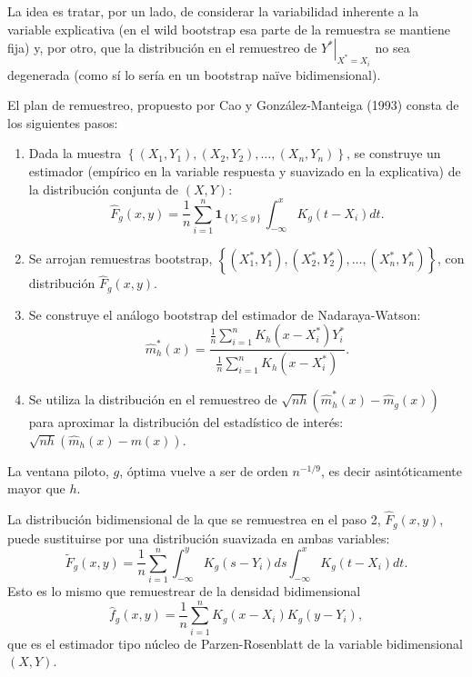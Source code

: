 \documentclass[]{book}
\theoremstyle{definition}
\theoremstyle{definition}
\theoremstyle{definition}
\theoremstyle{remark}
\begin{document}
La idea es tratar, por un lado, de considerar la variabilidad inherente
a la variable explicativa (en el wild bootstrap esa parte de la
remuestra se mantiene fija) y, por otro, que la distribución en el
remuestreo de \(\left. Y^{\ast}\right\vert _{X^{\ast}=X_i}\) no sea
degenerada (como sí lo sería en un bootstrap naïve bidimensional).

El plan de remuestreo, propuesto por Cao y González-Manteiga (1993)
consta de los siguientes pasos:

\begin{enumerate}
\def\labelenumi{\arabic{enumi}.}
\item
  Dada la muestra
  \(\left\{ \left( X_1,Y_1 \right),\left( X_2,Y_2 \right),\ldots ,\left( X_n,Y_n \right) \right\}\),
  se construye un estimador (empírico en la variable respuesta y
  suavizado en la explicativa) de la distribución conjunta de
  \(\left( X,Y \right)\):
  \[\hat{F}_{g}\left( x,y \right) =\frac{1}{n}\sum_{i=1}^{n}\mathbf{1}_{\left\{
  Y_i\leq y\right\} }\int_{-\infty }^{x}K_{g}\left( t-X_i \right) dt.\]
\item
  Se arrojan remuestras bootstrap,
  \(\left\{ \left( X_1^{\ast },Y_1^{\ast} \right),\left( X_2^{\ast},Y_2^{\ast} \right),\ldots ,\left( X_n^{\ast},Y_n^{\ast} \right) \right\}\),
  con distribución \(\hat{F}_{g}\left( x,y \right)\).
\item
  Se construye el análogo bootstrap del estimador de Nadaraya-Watson:
  \[\hat{m}_{h}^{\ast}\left( x \right) =\frac{\frac{1}{n}\sum_{i=1}^{n}K_{h}
  \left( x-X_i^{\ast} \right) Y_i^{\ast}}{\frac{1}{n}\sum_{i=1}^{n}K_{h}
  \left( x-X_i^{\ast} \right)}.\]
\item
  Se utiliza la distribución en el remuestreo de
  \(\sqrt{nh}\left( \hat{m}_{h}^{\ast}\left( x \right) -\hat{m}_{g}\left( x \right) \right)\)
  para aproximar la distribución del estadístico de interés:
  \(\sqrt{nh}\left( \hat{m}_{h}\left( x \right) -m\left( x \right) \right)\).
\end{enumerate}

La ventana piloto, \(g\), óptima vuelve a ser de orden \(n^{-1/9}\), es
decir asintóticamente mayor que \(h\).

La distribución bidimensional de la que se remuestrea en el paso 2,
\(\hat{F}_{g}\left( x,y \right)\), puede sustituirse por una
distribución suavizada en ambas variables:
\[\tilde{F}_{g}\left( x,y \right) =\frac{1}{n}\sum_{i=1}^{n}
\int_{-\infty}^{y}K_{g}\left( s-Y_i \right) ds \int_{-\infty }^{x}
K_{g}\left( t-X_i \right) dt.\] Esto es lo mismo que remuestrear de la
densidad bidimensional
\[\hat{f}_{g}\left( x,y \right) = \frac{1}{n}\sum_{i=1}^{n}
K_{g}\left( x-X_i \right) K_{g}\left( y-Y_i \right),\] que es el
estimador tipo núcleo de Parzen-Rosenblatt de la variable bidimensional
\(\left( X,Y \right)\).
\end{document}
